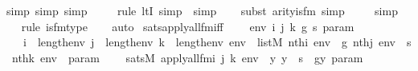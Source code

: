 \begin{isabellebody}
{\isacharparenleft}{\kern0pt}simp{\isacharcomma}{\kern0pt}\ simp{\isacharcomma}{\kern0pt}\ simp{\isacharparenright}{\kern0pt}\isanewline
\ \ \ \ \isamarkupfalse%
{\isacharparenleft}{\kern0pt}rule\ ltI{\isacharcomma}{\kern0pt}\ simp\ {\isacharcomma}{\kern0pt}\ simp{\isacharparenright}{\kern0pt}\isanewline
\ \ \ \isamarkupfalse%
{\isacharparenleft}{\kern0pt}subst\ arity{\isacharunderscore}{\kern0pt}is{\isacharunderscore}{\kern0pt}{}{\isacharunderscore}{\kern0pt}fm{\isacharcomma}{\kern0pt}\ simp{\isacharparenright}{\kern0pt}\isanewline
\ \ \ \isamarkupfalse%
\ simp\isanewline
\ \ \isamarkupfalse%
{\isacharparenleft}{\kern0pt}rule\ is{\isacharunderscore}{\kern0pt}{}{\isacharunderscore}{\kern0pt}fm{\isacharunderscore}{\kern0pt}type{\isacharparenright}{\kern0pt}\isanewline
\ \ \isamarkupfalse%
\ auto%
\endisatagproof
{\isafoldproof}%
%
\isadelimproof
\isanewline
%
\endisadelimproof
\isanewline
{}\isamarkupfalse%
\ sats{\isacharunderscore}{\kern0pt}apply{\isacharunderscore}{\kern0pt}all{\isacharunderscore}{\kern0pt}{}{\isacharunderscore}{\kern0pt}fm{\isacharunderscore}{\kern0pt}iff\ {\isacharcolon}{\kern0pt}\isanewline
\ \ \ env\ i\ j\ k\ g\ s\ param\isanewline
\ \ \ {\isachardoublequoteopen}i\ {\isacharless}{\kern0pt}\ length{\isacharparenleft}{\kern0pt}env{\isacharparenright}{\kern0pt}{\isachardoublequoteclose}\ {\isachardoublequoteopen}j\ {\isacharless}{\kern0pt}\ length{\isacharparenleft}{\kern0pt}env{\isacharparenright}{\kern0pt}{\isachardoublequoteclose}\ {\isachardoublequoteopen}k\ {\isacharless}{\kern0pt}\ length{\isacharparenleft}{\kern0pt}env{\isacharparenright}{\kern0pt}{\isachardoublequoteclose}\ {\isachardoublequoteopen}env\ {\isasymin}\ list{\isacharparenleft}{\kern0pt}M{\isacharparenright}{\kern0pt}{\isachardoublequoteclose}\ {\isachardoublequoteopen}nth{\isacharparenleft}{\kern0pt}i{\isacharcomma}{\kern0pt}\ env{\isacharparenright}{\kern0pt}\ {\isacharequal}{\kern0pt}\ g{\isachardoublequoteclose}\ {\isachardoublequoteopen}nth{\isacharparenleft}{\kern0pt}j{\isacharcomma}{\kern0pt}\ env{\isacharparenright}{\kern0pt}\ {\isacharequal}{\kern0pt}\ s{\isachardoublequoteclose}\ {\isachardoublequoteopen}nth{\isacharparenleft}{\kern0pt}k{\isacharcomma}{\kern0pt}\ env{\isacharparenright}{\kern0pt}\ {\isacharequal}{\kern0pt}\ param{\isachardoublequoteclose}\ \isanewline
\ \ \ {\isachardoublequoteopen}sats{\isacharparenleft}{\kern0pt}M{\isacharcomma}{\kern0pt}\ apply{\isacharunderscore}{\kern0pt}all{\isacharunderscore}{\kern0pt}{}{\isacharunderscore}{\kern0pt}fm{\isacharparenleft}{\kern0pt}i{\isacharcomma}{\kern0pt}\ j{\isacharcomma}{\kern0pt}\ k{\isacharparenright}{\kern0pt}{\isacharcomma}{\kern0pt}\ env{\isacharparenright}{\kern0pt}\ {\isasymlongleftrightarrow}\ {\isacharparenleft}{\kern0pt}{\isasymforall}y{\isachardot}{\kern0pt}\ y\ {\isasymin}\ s\ {\isasymlongrightarrow}\ g{\isacharbackquote}{\kern0pt}{\isacharless}{\kern0pt}y{\isacharcomma}{\kern0pt}\ param{\isachargreater}{\kern0pt}\ {\isacharequal}{\kern0pt}\ {}{\isacharparenright}{\kern0pt}{\isachardoublequoteclose}\ \isanewline

\end{isabellebody}
